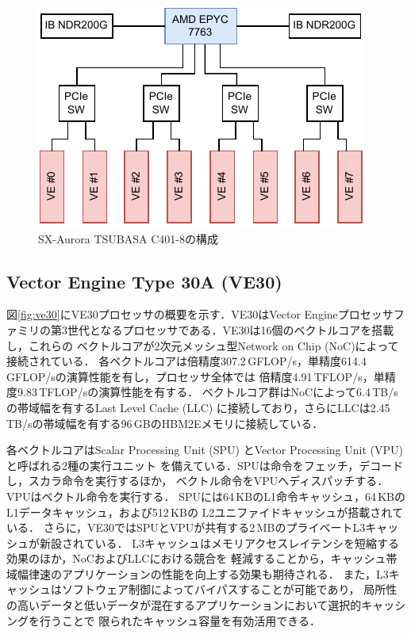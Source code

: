 ﻿\documentclass[submit,techrep,noauthor]{ipsj}
\begin{document}
\begin{figure}[tb]
  \centering
  \includegraphics{figs/node_arch.pdf}
  \caption{SX-Aurora TSUBASA C401-8の構成}\label{fig:node}
\end{figure}

\subsection{Vector Engine Type 30A (VE30)}


図\ref{fig:ve30}にVE30プロセッサの概要を示す．VE30はVector
Engineプロセッサファミリの第3世代となるプロセッサである．VE30は16個のベクトルコアを搭載し，これらの
ベクトルコアが2次元メッシュ型Network on Chip (NoC)によって接続されている．
各ベクトルコアは倍精度307.2\,GFLOP/s，単精度614.4\,GFLOP/sの演算性能を有し，プロセッサ全体では
倍精度4.91\,TFLOP/s，単精度9.83\,TFLOP/sの演算性能を有する．
ベクトルコア群はNoCによって6.4\,TB/sの帯域幅を有するLast Level Cache 
(LLC) に接続しており，さらにLLCは2.45\,TB/sの帯域幅を有する96\,GBのHBM2Eメモリに接続している．

各ベクトルコアはScalar Processing Unit (SPU) とVector Processing Unit (VPU) と呼ばれる2種の実行ユニット
を備えている．SPUは命令をフェッチ，デコードし，スカラ命令を実行するほか，
ベクトル命令をVPUへディスパッチする．VPUはベクトル命令を実行する．
SPUには64\,KBのL1命令キャッシュ，64\,KBのL1データキャッシュ，および512\,KBの
L2ユニファイドキャッシュが搭載されている．
さらに，VE30ではSPUとVPUが共有する2\,MBのプライベートL3キャッシュが新設されている．
L3キャッシュはメモリアクセスレイテンシを短縮する効果のほか，NoCおよびLLCにおける競合を
軽減することから，キャッシュ帯域幅律速のアプリケーションの性能を向上する効果も期待される．
また，L3キャッシュはソフトウェア制御によってバイパスすることが可能であり，
局所性の高いデータと低いデータが混在するアプリケーションにおいて選択的キャッシングを行うことで
限られたキャッシュ容量を有効活用できる．
\end{document}
